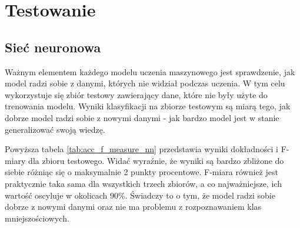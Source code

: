 \section{Testowanie}\label{sec:testowanie}
\subsection{Sieć neuronowa}\label{subsec:testowanie_siec_neuronowa}
Ważnym elementem każdego modelu uczenia maszynowego jest sprawdzenie, jak model radzi sobie z danymi, których nie widział podczas uczenia.
W tym celu wykorzystuje się zbiór testowy zawierający dane, które nie były użyte do trenowania modelu.
Wyniki klasyfikacji na zbiorze testowym są miarą tego, jak dobrze model radzi sobie z nowymi danymi - jak bardzo model jest w stanie generalizować swoją wiedzę.
\begin{table}[H]
    \centering
    \caption{Dokładność i F-miara dla zbioru testowego po 40 epokach}
    \label{tab:acc_f_measure_nn}
\end{table}
Powyższa tabela \ref{tab:acc_f_measure_nn} przedstawia wyniki dokładności i F-miary dla zbioru testowego. Widać wyraźnie, 
że wyniki są bardzo zbliżone do siebie różniąc się o maksymalnie 2 punkty procentowe.
F-miara również jest praktycznie taka sama dla wszystkich trzech zbiorów, a co najważniejsze, ich wartość oscyluje w okolicach 90\%. 
Świadczy to o tym, że model radzi sobie dobrze z nowymi danymi oraz
nie ma problemu z rozpoznawaniem klas mniejszościowych.
